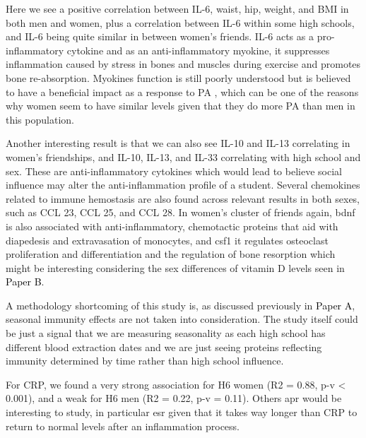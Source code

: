 


Here we see a positive correlation between IL-6, waist, hip, weight, and BMI in both men and women, plus a correlation between IL-6 within some high schools, and IL-6 being quite similar in between women's friends. IL-6 acts as a pro-inflammatory cytokine and as an anti-inflammatory myokine, it suppresses inflammation caused by stress in bones and muscles during exercise and promotes bone re-absorption. Myokines function is still poorly understood but is believed to have a beneficial impact as a response to PA \cite{Ostrowski2000}, which can be one of the reasons why women seem to have similar levels given that they do more PA than men in this population.

Another interesting result is that we can also see IL-10 and IL-13 correlating in women's friendships, and IL-10, IL-13, and IL-33 correlating with high school and sex. These are anti-inflammatory cytokines which would lead to believe social influence may alter the anti-inflammation profile of a student. Several chemokines related to immune hemostasis are also found across relevant results in both sexes, such as CCL 23, CCL 25, and CCL 28. In women's cluster of friends again, \gls{bdnf} is also associated with anti-inflammatory, chemotactic proteins that aid with diapedesis and extravasation of monocytes, and \gls{csf1} it regulates osteoclast proliferation and differentiation and the regulation of bone resorption which might be interesting considering the sex differences of vitamin D levels seen in \colorbox{PaperColor}{\textcolor{black}{Paper B}}.


A methodology shortcoming of this study is, as discussed previously in \colorbox{PaperColor}{\textcolor{black}{Paper A}}, seasonal immunity effects are not taken into consideration. The study itself could be just a signal that we are measuring seasonality as each high school has different blood extraction dates and we are just seeing proteins reflecting immunity determined by time rather than high school influence.

For CRP, we found a very strong association for H6 women (R2 = 0.88, p-v < 0.001), and a weak for H6 men (R2 = 0.22, p-v = 0.11). Others \gls{apr} would be interesting to study, in particular \gls{esr} given that it takes way longer than CRP to return to normal levels after an inflammation process.


